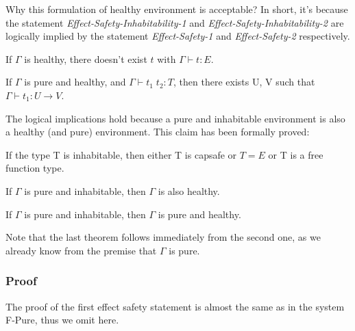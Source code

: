 Why this formulation of healthy environment is acceptable? In short,
it's because the statement \emph{Effect-Safety-Inhabitability-1} and
\emph{Effect-Safety-Inhabitability-2} are logically implied by the
statement \emph{Effect-Safety-1} and \emph{Effect-Safety-2}
respectively.

\begin{definition}
  If $\Gamma$ is healthy, there doesn't exist $t$ with
  $\Gamma \vdash t : E$.
\end{definition}

\begin{definition}
  If $\Gamma$ is pure and healthy, and $\Gamma \vdash t_1 \; t_2 : T$,
  then there exists U, V such that $\Gamma \vdash t_1 : U \to V$.
\end{definition}

The logical implications hold because a pure and inhabitable
environment is also a healthy (and pure) environment. This claim has
been formally proved:

\begin{lemma}
  If the type T is inhabitable, then either T is capsafe or $T = E$ or
  T is a free function type.
\end{lemma}

\begin{theorem}
  If $\Gamma$ is pure and inhabitable, then $\Gamma$ is also healthy.
\end{theorem}

\begin{theorem}
  If $\Gamma$ is pure and inhabitable, then $\Gamma$ is pure and
  healthy.
\end{theorem}

Note that the last theorem follows immediately from the second one, as
we already know from the premise that $\Gamma$ is pure.


\subsubsection{Proof}

The proof of the first effect safety statement is almost the same as
in the system F-Pure, thus we omit here.

